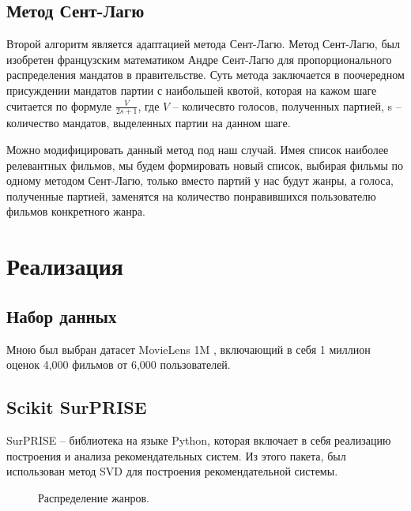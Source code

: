 \documentclass[a4paper,article,14pt]{extarticle}
\begin{document}
\subsection{Метод Сент-Лагю}
Второй алгоритм является адаптацией метода Сент-Лагю. \cite{voc2} Метод Сент-Лагю, был изобретен французским математиком Андре Сент-Лагю для пропорционального распределения мандатов в правительстве. Суть метода заключается в поочередном присуждении мандатов партии с наибольшей квотой, которая на кажом шаге считается по формуле $\frac{V}{2s+1}$, где $V$ -- количесвто голосов, полученных партией, s -- количество мандатов, выделенных партии на данном шаге.

Можно модифицировать данный метод под наш случай. Имея список наиболее релевантных фильмов, мы будем формировать новый список, выбирая фильмы по одному методом Сент-Лагю, только вместо партий у нас будут жанры, а голоса, полученные партией, заменятся на количество понравившихся пользователю фильмов конкретного жанра.
\section{Реализация}
\subsection{Набор данных}
Мною был выбран датасет MovieLens 1M \cite{voc3}, включающий в себя 1 миллион оценок 4,000 фильмов от 6,000 пользователей.
\subsection{Scikit SurPRISE}
SurPRISE \cite{voc4} -- библиотека на языке Python, которая включает в себя реализацию построения и анализа рекомендательных систем. 
Из этого пакета, был использован метод SVD для построения рекомендательной системы.
\begin{figure}[ht]
  \begin{center}
  
  \caption{
  \label{graph-fig}
       Распределение жанров.}
  \end {center}
  \end {figure}
\pagebreak
\end{document}
